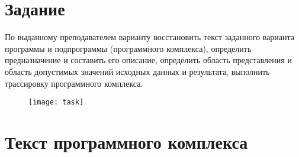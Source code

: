 \tableofcontents

\newpage

\section{Задание}
По выданному преподавателем варианту восстановить текст заданного варианта программы и подпрограммы (программного комплекса), определить предназначение и составить его описание, определить область представления и область допустимых значений исходных данных и результата, выполнить трассировку программного комплекса.
\begin{figure}[H]
\centering
\texttt{[image: task]}
\label{pic:task}
\end{figure}

\section{Текст программного комплекса}

